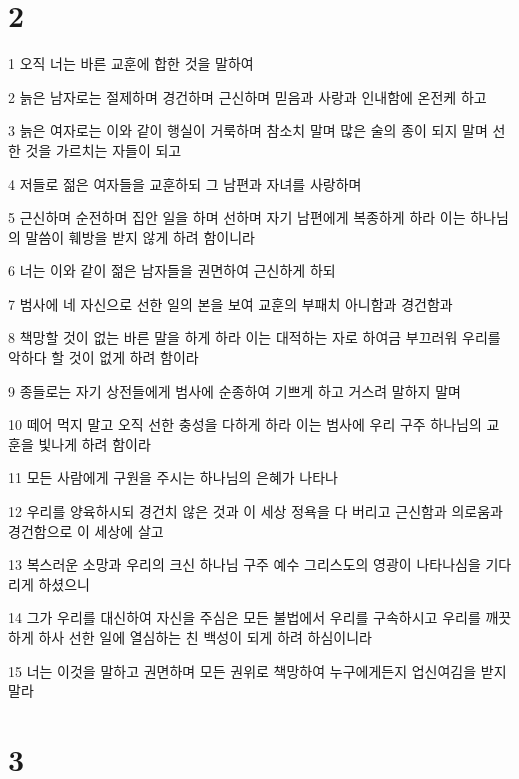 \chapter{2}

\par 1 오직 너는 바른 교훈에 합한 것을 말하여
\par 2 늙은 남자로는 절제하며 경건하며 근신하며 믿음과 사랑과 인내함에 온전케 하고
\par 3 늙은 여자로는 이와 같이 행실이 거룩하며 참소치 말며 많은 술의 종이 되지 말며 선한 것을 가르치는 자들이 되고
\par 4 저들로 젊은 여자들을 교훈하되 그 남편과 자녀를 사랑하며
\par 5 근신하며 순전하며 집안 일을 하며 선하며 자기 남편에게 복종하게 하라 이는 하나님의 말씀이 훼방을 받지 않게 하려 함이니라
\par 6 너는 이와 같이 젊은 남자들을 권면하여 근신하게 하되
\par 7 범사에 네 자신으로 선한 일의 본을 보여 교훈의 부패치 아니함과 경건함과
\par 8 책망할 것이 없는 바른 말을 하게 하라 이는 대적하는 자로 하여금 부끄러워 우리를 악하다 할 것이 없게 하려 함이라
\par 9 종들로는 자기 상전들에게 범사에 순종하여 기쁘게 하고 거스려 말하지 말며
\par 10 떼어 먹지 말고 오직 선한 충성을 다하게 하라 이는 범사에 우리 구주 하나님의 교훈을 빛나게 하려 함이라
\par 11 모든 사람에게 구원을 주시는 하나님의 은혜가 나타나
\par 12 우리를 양육하시되 경건치 않은 것과 이 세상 정욕을 다 버리고 근신함과 의로움과 경건함으로 이 세상에 살고
\par 13 복스러운 소망과 우리의 크신 하나님 구주 예수 그리스도의 영광이 나타나심을 기다리게 하셨으니
\par 14 그가 우리를 대신하여 자신을 주심은 모든 불법에서 우리를 구속하시고 우리를 깨끗하게 하사 선한 일에 열심하는 친 백성이 되게 하려 하심이니라
\par 15 너는 이것을 말하고 권면하며 모든 권위로 책망하여 누구에게든지 업신여김을 받지 말라

\chapter{3}

